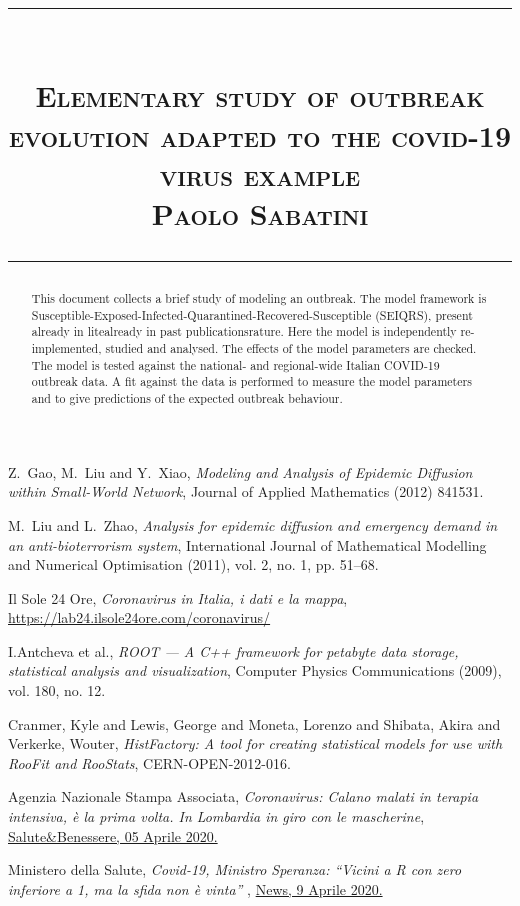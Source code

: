 \documentclass{article}
\title{
\begin{flushleft}
\rule{\textwidth}{1pt}\\
  \textsc{\textbf{Elementary study of outbreak evolution adapted to the covid-19 virus example 	}}\\[2mm]
\textsc{\large Paolo Sabatini}\\
\rule{\textwidth}{1pt}
  \end{flushleft}
}
\date{}
\begin{document}
\maketitle


\begin{abstract}
This document collects a brief study of modeling an outbreak. The model framework is Susceptible-Exposed-Infected-Quarantined-Recovered-Susceptible (SEIQRS), present already in litealready in past publicationsrature. Here the model is independently re-implemented, studied and analysed. The effects of the model parameters are checked. The model is tested against the national- and regional-wide Italian COVID-19 outbreak data. A fit against the data is performed to measure the model parameters and to give predictions of the expected outbreak behaviour.
\end{abstract}
\vspace{2cm}
\tableofcontents

\newpage








\begin{thebibliography}{9}
Z.~Gao, M.~Liu and Y.~Xiao, 
\textit{Modeling and Analysis of Epidemic Diffusion within Small-World Network},
Journal of Applied Mathematics (2012) 841531.

M.~Liu and L.~Zhao, 
\textit{Analysis for epidemic diffusion and emergency demand in an anti-bioterrorism
system},
International Journal of Mathematical Modelling and Numerical Optimisation (2011), vol. 2, no. 1, pp. 51–68.

Il Sole 24 Ore,
\textit{ 
Coronavirus in Italia, i dati e la mappa},
\href{https://lab24.ilsole24ore.com/coronavirus/}{https://lab24.ilsole24ore.com/coronavirus/}

I.Antcheva et al., 
\textit{ 
ROOT — A C++ framework for petabyte data storage, statistical analysis and visualization},
Computer Physics Communications (2009), vol. 180, no. 12.

Cranmer, Kyle and Lewis, George and Moneta, Lorenzo and Shibata, Akira and Verkerke, Wouter,
\textit{ 
HistFactory: A tool for creating statistical models for use with RooFit and RooStats},
CERN-OPEN-2012-016.

Agenzia Nazionale Stampa Associata, 
\textit{Coronavirus: Calano malati in terapia intensiva, è la prima volta. In Lombardia in giro con le mascherine},
\href{https://www.ansa.it/canale_saluteebenessere/notizie/sanita/2020/04/04/coronavirus-_29e301b7-fd53-405c-9e5d-92f907057932.html}{Salute\&Benessere, 05 Aprile 2020.}

Ministero della Salute, \textit{Covid-19, Ministro Speranza: ``Vicini a R con zero inferiore a 1, ma la sfida non è vinta'' },
\href{http://www.salute.gov.it/portale/news/p3_2_1_1_1.jsp?lingua=italiano&menu=notizie&p=dalministero&id=4429}{News, 9 Aprile 2020.}

\end{thebibliography}
\end{document}
